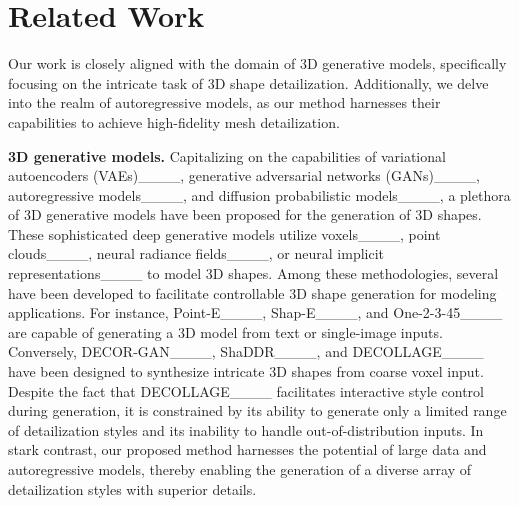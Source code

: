 \section{Related Work}
Our work is closely aligned with the domain of 3D generative models, specifically focusing on the intricate task of 3D shape detailization. Additionally, we delve into the realm of autoregressive models, as our method harnesses their capabilities to achieve high-fidelity mesh detailization.

\noindent\textbf{3D generative models.}
Capitalizing on the capabilities of variational autoencoders (VAEs)____, generative adversarial networks (GANs)____, autoregressive models____, and diffusion probabilistic models____, a plethora of 3D generative models have been proposed for the generation of 3D shapes. These sophisticated deep generative models utilize voxels____, point clouds____, neural radiance fields____, or neural implicit representations____ to model 3D shapes. Among these methodologies, several have been developed to facilitate controllable 3D shape generation for modeling applications. For instance, Point-E____, Shap-E____, and One-2-3-45____ are capable of generating a 3D model from text or single-image inputs. Conversely, DECOR-GAN____, ShaDDR____, and DECOLLAGE____ have been designed to synthesize intricate 3D shapes from coarse voxel input. Despite the fact that DECOLLAGE____ facilitates interactive style control during generation, it is constrained by its ability to generate only a limited range of detailization styles and its inability to handle out-of-distribution inputs. In stark contrast, our proposed method harnesses the potential of large data and autoregressive models, thereby enabling the generation of a diverse array of detailization styles with superior details.

